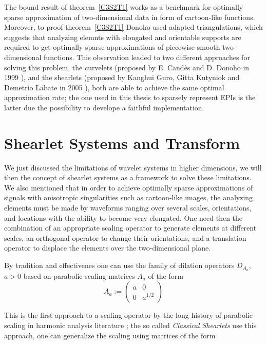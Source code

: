 \bigskip

The bound result of theorem~\ref{C3S2T1} works as a benchmark for optimally sparse approximation of two-dimensional data in form of cartoon-like functions. Moreover, to proof theorem~\ref{C3S2T1} Donoho used adapted triangulations, which suggests that analyzing elemnts with elongated and orientable supports are required to get optimally sparse approximations of piecewise smooth two-dimensional functions. This observation leaded to two different approaches for solving this problem, the curvelets (proposed by E. Candès and D. Donoho in 1999 \cite{Curvelets}), and the shearlets (proposed by Kanghui Guro, Gitta Kutyniok and Demetrio Labate in 2005 \cite{FirstShearlets}), both are able to achieve the same optimal approximation rate; the one used in this thesis to sparsely represent EPIs is the latter due the possibility to develope a faithful implementation. 

\section{Shearlet Systems and Transform}

We just discussed the limitations of wavelet systems in higher dimensions, we will then the concept of shearlet systems as a framework to solve these limitations. We also mentioned that in order to achieve optimally sparse approximations of signals with anisotropic singularities such as cartoon-like images, the analyzing elements must be made by waveforms ranging over several scales, orientations, and locations with the ability to become very elongated. One need then the combination of an appropriate scaling operator to generate elements at different scales, an orthogonal operator to change their orientations, and a translation operator to displace the elements over the two-dimensional plane. 

\bigskip

By tradition and effectivenes one can use the family of dilation operators $D_{A_a}$, $a>0$ based on parabolic scaling matrices $A_a$ of the form
$$
A_a:=
\left(
\begin{matrix}
a & 0 \\
0 & a^{1/2}
\end{matrix}
\right)
$$

This is the first approach to a scaling operator by the long history of parabolic scaling in harmonic analysis literature \cite{Fefferman}; the so called \textit{Classical Shearlets} use this approach, one can generalize the scaling using matrices of the form 

